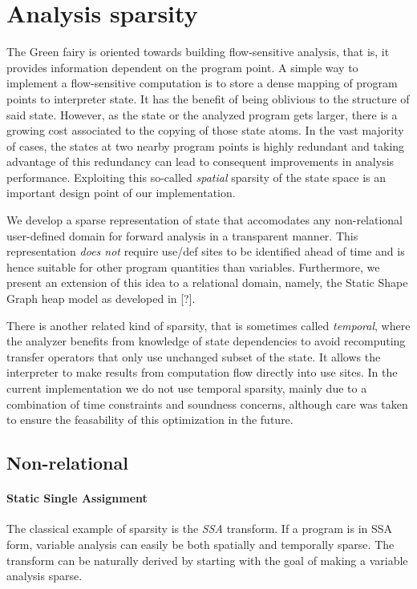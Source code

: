 \documentclass[11pt]{article}
\begin{document}
\section*{Analysis sparsity}

The Green fairy is oriented towards building flow-sensitive analysis, that is, it provides information dependent on the program point.
A simple way to implement a flow-sensitive computation is to store a dense mapping of program points to interpreter state. It has the benefit of being oblivious to the structure of said state.
However, as the state or the analyzed program gets larger, there is a growing cost associated to the copying of those state atoms.
In the vast majority of cases, the states at two nearby program points is highly redundant and taking advantage of this redundancy can lead to consequent improvements in analysis performance. Exploiting this so-called \emph{spatial} sparsity of the state space is an important design point of our implementation.

We develop a sparse representation of state that accomodates any non-relational user-defined domain for forward analysis in a transparent manner.
This representation \emph{does not} require use/def sites to be identified ahead of time and is hence suitable for other program quantities than variables.
Furthermore, we present an extension of this idea to a relational domain, namely, the Static Shape Graph heap model as developed in [?].

There is another related kind of sparsity, that is sometimes called \emph{temporal}, where the analyzer benefits from knowledge of state dependencies to avoid recomputing transfer operators that only use unchanged subset of the state. It allows the interpreter to make results from computation flow directly into use sites. In the current implementation we do not use temporal sparsity, mainly due to a combination of time constraints and soundness concerns, although care was taken to ensure the feasability of this optimization in the future.

\subsection*{Non-relational}

\paragraph{Static Single Assignment} The classical example of sparsity is the \emph{SSA} transform. If a program is in SSA form, variable analysis can easily be both spatially and temporally sparse. The transform can be naturally derived by starting with the goal of making a variable analysis sparse.
\end{document}
